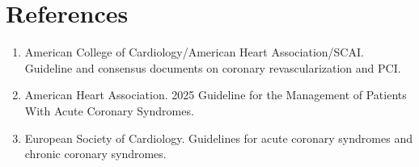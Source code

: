 \section*{References}
\begin{enumerate}
\item American College of Cardiology/American Heart Association/SCAI. Guideline and consensus documents on coronary revascularization and PCI.
\item American Heart Association. 2025 Guideline for the Management of Patients With Acute Coronary Syndromes.
\item European Society of Cardiology. Guidelines for acute coronary syndromes and chronic coronary syndromes.
\end{enumerate}
